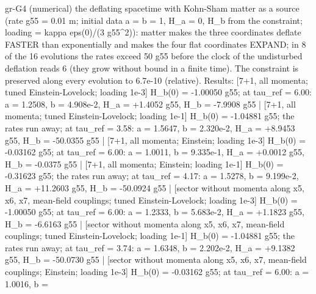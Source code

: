 \documentclass[
  10pt,
]{article}
\newenvironment{Shaded}{}{}
\newcommand{\NormalTok}[1]{#1}
\begin{document}
\begin{Shaded}
\begin{Highlighting}[]
\NormalTok{[PASS] gr{-}G4  (numerical) the deflating spacetime with Kohn{-}Sham matter as a source (rate g55 = 0.01 m; initial data a = b = 1, H\_a = 0, H\_b from the constraint; loading = kappa eps(0)/(3 g55\^{}2)): matter makes the three coordinates deflate FASTER than exponentially and makes the four flat coordinates EXPAND; in 8 of the 16 evolutions the rates exceed 50 g55 before the clock of the undisturbed deflation reads 6 (they grow without bound in a finite time). The constraint is preserved along every evolution to 6.7e{-}10 (relative). Results: [7+1, all momenta; tuned Einstein{-}Lovelock; loading 1e{-}3] H\_b(0) = {-}1.00050 g55; at tau\_ref = 6.00: a = 1.2508, b = 4.908e{-}2, H\_a = +1.4052 g55, H\_b = {-}7.9908 g55 | [7+1, all momenta; tuned Einstein{-}Lovelock; loading 1e{-}1] H\_b(0) = {-}1.04881 g55; the rates run away; at tau\_ref = 3.58: a = 1.5647, b = 2.320e{-}2, H\_a = +8.9453 g55, H\_b = {-}50.0355 g55 | [7+1, all momenta; Einstein; loading 1e{-}3] H\_b(0) = {-}0.03162 g55; at tau\_ref = 6.00: a = 1.0011, b = 9.335e{-}1, H\_a = +0.0012 g55, H\_b = {-}0.0375 g55 | [7+1, all momenta; Einstein; loading 1e{-}1] H\_b(0) = {-}0.31623 g55; the rates run away; at tau\_ref = 4.17: a = 1.5278, b = 9.199e{-}2, H\_a = +11.2603 g55, H\_b = {-}50.0924 g55 | [sector without momenta along x5, x6, x7, mean{-}field couplings; tuned Einstein{-}Lovelock; loading 1e{-}3] H\_b(0) = {-}1.00050 g55; at tau\_ref = 6.00: a = 1.2333, b = 5.683e{-}2, H\_a = +1.1823 g55, H\_b = {-}6.6163 g55 | [sector without momenta along x5, x6, x7, mean{-}field couplings; tuned Einstein{-}Lovelock; loading 1e{-}1] H\_b(0) = {-}1.04881 g55; the rates run away; at tau\_ref = 3.74: a = 1.6348, b = 2.202e{-}2, H\_a = +9.1382 g55, H\_b = {-}50.0730 g55 | [sector without momenta along x5, x6, x7, mean{-}field couplings; Einstein; loading 1e{-}3] H\_b(0) = {-}0.03162 g55; at tau\_ref = 6.00: a = 1.0016, b =}

\end{Highlighting}
\end{Shaded}
\end{document}
